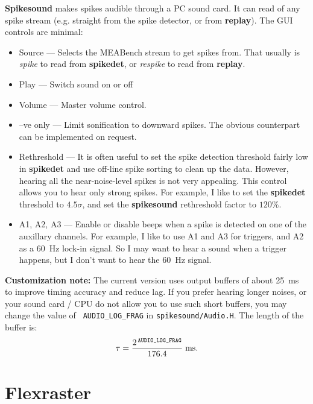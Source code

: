 \documentclass[12pt,oneside]{book}
\def\meabench{{MEABench}\xspace}
\def\prog#1{{\bf #1}}
\def\stream#1{{\it #1}\xspace}
\def\streamtype#1{{\sc #1}\xspace}
\def\spike{\streamtype{spike}}
\begin{document}
\prog{Spikesound} makes spikes audible through a PC sound card. It can
read of any \spike stream (e.g. straight from the spike detector, or
from \prog{replay}). The GUI controls are minimal:
\begin{itemize}
\item Source --- Selects the \meabench stream to get spikes from. That
usually is \stream{spike} to read from \prog{spikedet}, or
\stream{respike} to read from \prog{replay}.

\item Play --- Switch sound on or off

\item Volume --- Master volume control.

\item --ve only --- Limit sonification to downward spikes. The obvious
counterpart can be implemented on request.

\item Rethreshold --- It is often useful to set the spike detection
threshold fairly low in \prog{spikedet} and use off-line spike sorting
to clean up the data. However, hearing all the
near-noise-level spikes is not very appealing. This control allows you
to hear only strong spikes. For example, I like to set the
\prog{spikedet} threshold to $4.5 \sigma$, and set the
\prog{spikesound} rethreshold factor to $120\%$.

\item A1, A2, A3 --- Enable or disable beeps when a spike is detected
on one of the auxillary channels. For example, I like to use A1 and A3
for triggers, and A2 as a 60~Hz lock-in signal. So I may want to hear
a sound when a trigger happens, but I don't want to hear the 60~Hz
signal.
\end{itemize}

{\bf Customization note:} The current version uses output buffers of
about 25~ms to improve timing accuracy and reduce lag. If you prefer
hearing longer noises, or your sound card / CPU do not allow you to
use such short buffers, you may change the value of {\tt\small
AUDIO\_LOG\_FRAG} in {\tt\small spikesound/Audio.H}. The length of the
buffer is:
\[
	\tau = {2^{\,\textrm{\tt\scriptsize AUDIO\_LOG\_FRAG}}
	 \over 	176.4} \; {\mathrm{ms}}.
\]

\section{Flexraster}
\end{document}
